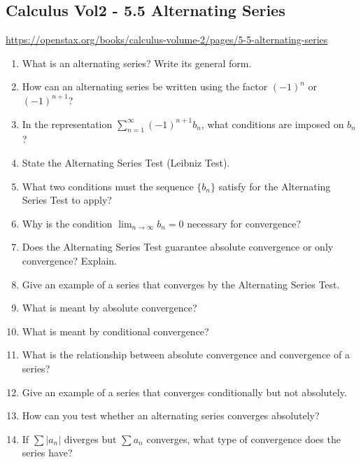 \subsection{Calculus Vol2 - 5.5 Alternating Series}

\url{https://openstax.org/books/calculus-volume-2/pages/5-5-alternating-series}

\begin{enumerate}

\item What is an alternating series? Write its general form.

\item How can an alternating series be written using the factor $(-1)^n$ or $(-1)^{n+1}$?

\item In the representation $\sum_{n=1}^{\infty} (-1)^{n+1} b_n$, what conditions are imposed on $b_n$?

\item State the Alternating Series Test (Leibniz Test).

\item What two conditions must the sequence $\{b_n\}$ satisfy for the Alternating Series Test to apply?

\item Why is the condition $\lim_{n \to \infty} b_n = 0$ necessary for convergence?

\item Does the Alternating Series Test guarantee absolute convergence or only convergence? Explain.

\item Give an example of a series that converges by the Alternating Series Test.

\item What is meant by absolute convergence?

\item What is meant by conditional convergence?

\item What is the relationship between absolute convergence and convergence of a series?

\item Give an example of a series that converges conditionally but not absolutely.

\item How can you test whether an alternating series converges absolutely?

\item If $\sum |a_n|$ diverges but $\sum a_n$ converges, what type of convergence does the series have?


\end{enumerate}
